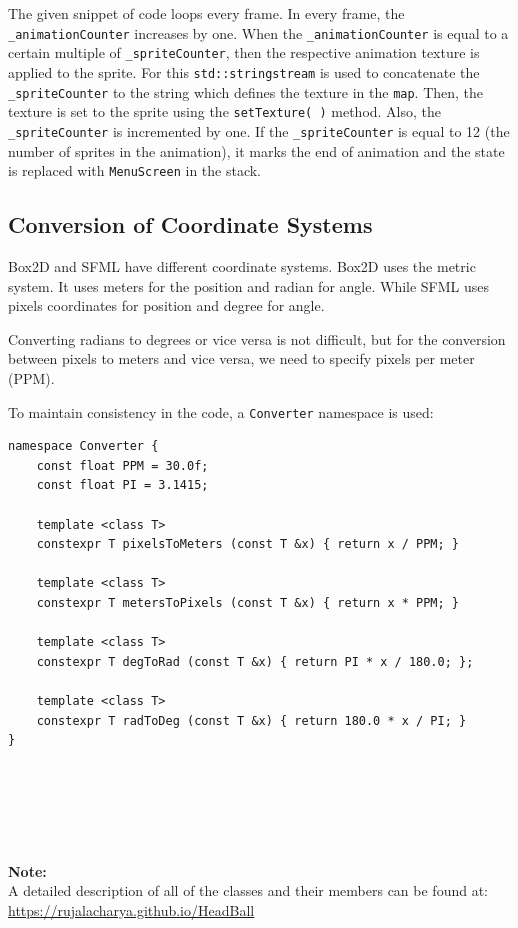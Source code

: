 \documentclass[main]{subfiles}
\begin{document}
The given snippet of code loops every frame. In every frame, the \texttt{\_animationCounter} increases by one. When the \texttt{\_animationCounter} is equal to a certain multiple of \texttt{\_spriteCounter}, then the respective animation texture is applied to the sprite. For this \texttt{std::stringstream} is used to concatenate the \texttt{\_spriteCounter} to the string which defines the texture in the \texttt{map}. Then, the texture is set to the sprite using the \texttt{setTexture( )} method. Also, the \texttt{\_spriteCounter} is incremented by one. If the \texttt{\_spriteCounter} is equal to 12 (the number of sprites in the animation), it marks the end of animation and the state is replaced with \texttt{MenuScreen} in the stack.

\subsection{Conversion of Coordinate Systems}
Box2D and SFML have different coordinate systems. Box2D uses the metric system. It uses meters for the position and radian for angle. While SFML uses pixels coordinates for position and degree for angle.

Converting radians to degrees or vice versa is not difficult, but for the conversion between pixels to meters and vice versa, we need to specify pixels per meter (PPM).

To maintain consistency in the code, a \texttt{Converter} namespace is used: 
\begin{verbatim}
namespace Converter {
    const float PPM = 30.0f;
    const float PI = 3.1415;

    template <class T>
    constexpr T pixelsToMeters (const T &x) { return x / PPM; }

    template <class T>
    constexpr T metersToPixels (const T &x) { return x * PPM; }

    template <class T>
    constexpr T degToRad (const T &x) { return PI * x / 180.0; };

    template <class T>
    constexpr T radToDeg (const T &x) { return 180.0 * x / PI; }
}
\end{verbatim}


\\ \\ \\ \\ \\ \textbf{Note:}\\
A detailed description of all of the classes and their members can be found at:
\url{https://rujalacharya.github.io/HeadBall}
\end{document}
